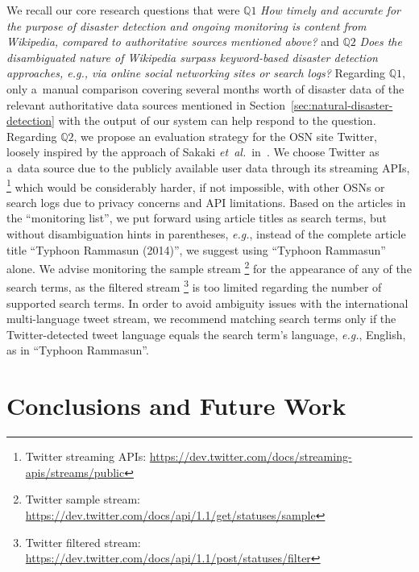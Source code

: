 \documentclass[letterpaper]{article}
\begin{document}
We recall our core research questions that were
$\mathbb{Q}1$ \emph{How timely and accurate for the purpose
of disaster detection and ongoing monitoring is content from Wikipedia,
compared to authoritative sources mentioned above?} and
$\mathbb{Q}2$ \emph{Does the disambiguated nature of Wikipedia
surpass keyword-based disaster detection approaches,
\emph{e.g.}, via online social networking sites or search logs?}
Regarding $\mathbb{Q}1$, only a~manual comparison
covering several months worth
of disaster data of the relevant authoritative data sources
mentioned in Section~\ref{sec:natural-disaster-detection}
with the output of our system can help respond to the question.
Regarding $\mathbb{Q}2$, we propose an evaluation strategy
for the OSN site Twitter,
loosely inspired by the approach of Sakaki \emph{et~al.}\
in~\cite{sakaki2010earthquake}.
We choose Twitter as a~data source due to the publicly available user data
through its streaming APIs,%
\footnote{Twitter streaming APIs:
\url{https://dev.twitter.com/docs/streaming-apis/streams/public}}
which would be considerably harder, if not impossible, with other OSNs or search logs
due to privacy concerns and API limitations.
Based on the articles in the ``monitoring list'',
we put forward using article titles as search terms,
but without disambiguation hints in parentheses,
\emph{e.g.}, instead of the complete article title
``Typhoon Rammasun (2014)'', we suggest using ``Typhoon Rammasun'' alone.
We advise monitoring the sample stream%
\footnote{Twitter sample stream:
\url{https://dev.twitter.com/docs/api/1.1/get/statuses/sample}}
for the appearance of any of the search terms,
as the filtered stream%
\footnote{Twitter filtered stream:
\url{https://dev.twitter.com/docs/api/1.1/post/statuses/filter}}
is too limited regarding the number of supported search terms.
In order to avoid ambiguity issues with the
international multi-language tweet stream,
we recommend matching search terms only
if the Twitter-detected tweet language equals
the search term's language, \emph{e.g.}, English, as in ``Typhoon Rammasun''.

\section{Conclusions and Future Work}
\label{sec:Conclusion}
\end{document}

